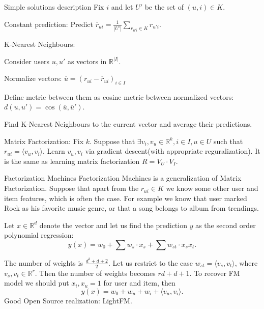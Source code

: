 \documentclass{beamer}
\theoremstyle{remark}
\begin{document}
\begin{frame}{Simple solutions description}
    Fix $i$ and let $U'$ be the set of $(u,i) \in K$.\vspace{0.1in} 
    
    Constant prediction: Predict $\overline{r}_{ui} = \frac{1}{|U'|}\sum\limits_{r_{u'i}\in K}r_{u'i}$.\vspace{0.1in}
    
    K-Nearest Neighbours: 
    
    Consider users $u, u'$ as vectors in $\mathbb{R}^{|I|}$. 
    
    Normalize vectors: $\overline{u} = (r_{ui} - \overline{r}_{ui})_{i\in I}$ 
    
    Define metric between them as cosine metric between normalized vectors: $d(u, u') = \cos(\overline{u}, \overline{u}')$.
    
    Find K-Nearest Neighbours to the current vector and average their predictions.\vspace{0.1in}
    
    Matrix Factorization: Fix $k$. Suppose that $\exists v_i, v_u\in \mathbb{R}^{k}, i\in I, u\in U$ such that $r_{ui} = \langle v_u, v_i\rangle$. Learn $v_u, v_i$ via gradient descent(with appropriate reguralization). It is the same as learning matrix factorization $R = V_{U} \cdot V_{I}$.
\end{frame}

\begin{frame}{Factorization Machines}
    Factorization Machines is a generalization of Matrix Factorization. Suppose that apart from the $r_{ui}\in K$ we know some other user and item features, which is often the case. For example we know that user marked Rock as his favorite music genre, or that a song belongs to album from trendings.\vspace{0.1in}
    
    Let $x \in \mathbb{R}^d$ denote the vector and let us find the prediction $y$ as the second order polynomial regression: 
    $$y(x) = w_0 + \sum w_s\cdot x_s  + \sum w_{st}\cdot x_s x_t.$$
    
    The number of weights is $\frac{d^2 + d + 2}{2}$. Let us restrict to the case $w_{st} = \langle v_s, v_t\rangle$, where $v_s, v_t \in \mathbb{R}^r$. Then the number of weights becomes $rd + d + 1$. To recover FM model we should put $x_i, x_u = 1$ for user and item, then $$y(x) = w_0 + w_u + w_i + \langle v_u, v_i\rangle.$$
    Good Open Source realization: LightFM.
\end{frame}
\end{document}
